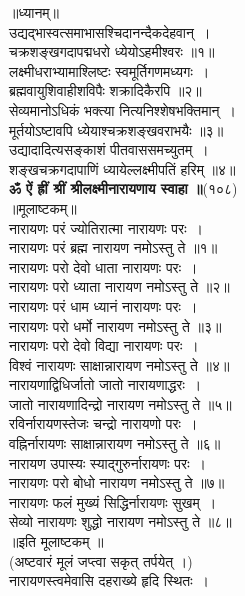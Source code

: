 \documentclass[twoside,top=1.7cm, bottom=1.7cm, outer=1cm,landscape, inner=1.5cm,a5paper,]{book}
\begin{document}
\begin{center}
॥ध्यानम्॥\\
उद्यद्भास्वत्समाभासश्चिदानन्दैकदेहवान्~।\\
चक्रशङ्खगदापद्मधरो ध्येयोऽहमीश्वरः ॥१॥\\[10pt]
लक्ष्मीधराभ्यामाश्लिष्टः स्वमूर्तिगणमध्यगः~।\\
ब्रह्मवायुशिवाहीशविपैः शक्रादिकैरपि ॥२॥\\[10pt]
सेव्यमानोऽधिकं भक्त्या नित्यनिश्शेषभक्तिमान्~।\\
मूर्तयोऽष्टावपि ध्येयाश्चक्रशङ्खवराभयैः ॥३॥\\[10pt]
\newpage
उद्यादादित्यसङ्काशं पीतवाससमच्युतम्~।\\
शङ्खचक्रगदापाणिं ध्यायेल्लक्ष्मीपतिं हरिम् ॥४॥\\[10pt]
{\bfseries ॐ ऐं ह्रीं श्रीं श्रीलक्ष्मीनारायणाय स्वाहा ॥}(१०८)\\
॥मूलाष्टकम्॥\\
नारायणः परं ज्योतिरात्मा नारायणः परः~।\\
नारायणः परं ब्रह्म नारायण नमोऽस्तु ते ॥१॥\\[10pt]
नारायणः परो देवो धाता नारायणः परः~।\\
नारायणः परो ध्याता नारायण नमोऽस्तु ते ॥२॥\\[10pt]
\newpage
नारायणः परं धाम ध्यानं नारायणः परः~।\\
नारायणः परो धर्मो नारायण नमोऽस्तु ते ॥३॥\\[10pt]
नारायणः परो देवो विद्या नारायणः परः~।\\
विश्वं नारायणः साक्षान्नारायण नमोऽस्तु ते ॥४॥\\[10pt]
नारायणाद्विधिर्जातो जातो नारायणाद्धरः~।\\
जातो नारायणादिन्द्रो नारायण नमोऽस्तु ते ॥५॥\\[10pt]
रविर्नारायणस्तेजः चन्द्रो नारायणो परः~।\\
वह्निर्नारायणः साक्षान्नारायण नमोऽस्तु ते ॥६॥\\[10pt]
\newpage
नारायण उपास्यः स्याद्गुरुर्नारायणः परः~।\\
नारायणः परो बोधो नारायण नमोऽस्तु ते ॥७‍॥\\[10pt]
नारायणः फलं मुख्यं सिद्धिर्नारायणः सुखम्~।\\
सेव्यो नारायणः शुद्धो नारायण नमोऽस्तु ते ॥८॥\\
॥इति मूलाष्टकम् ॥\\
(अष्टवारं मूलं जप्त्वा सकृत्  तर्पयेत् ।)\\[10pt]
नारायणस्त्वमेवासि दहराख्ये हृदि स्थितः~।\\

\end{center}
\end{document}
